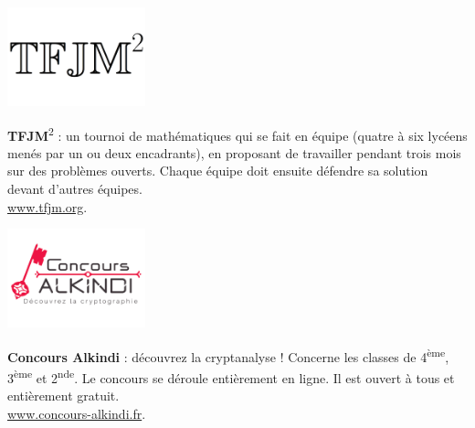 \begin{minipage}[c]{.46\linewidth}
\includegraphics[width=40mm]{01-Intro/logos/tfjm.png}
\end{minipage}
\begin{minipage}[c]{.46\linewidth}
		
\textbf{TFJM}\textsuperscript{2} : un tournoi de mathématiques qui se fait en équipe (quatre à six lycéens menés par un ou deux encadrants), en proposant de travailler pendant trois mois sur des problèmes ouverts. Chaque équipe doit ensuite défendre sa solution devant d'autres équipes. \\
\url{www.tfjm.org}.
\end{minipage} \hfill

\vfill
\vspace{4mm}

\vfill


\begin{minipage}[c]{.46\linewidth}
\includegraphics[width=40mm]{01-Intro/logos/alkindi.png}
\end{minipage}
\begin{minipage}[c]{.46\linewidth}
\textbf{Concours Alkindi} : découvrez la cryptanalyse !
Concerne les classes de 4\textsuperscript{ème}, 3\textsuperscript{ème} et 2\textsuperscript{nde}. Le concours se déroule entièrement en ligne. Il est ouvert à tous et entièrement gratuit. \\
\url{ www.concours-alkindi.fr}.

\end{minipage} \hfill
\vfill
\vspace{4mm}

\vfill

